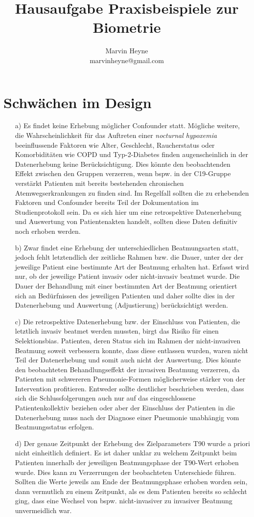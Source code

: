 \documentclass{scrartcl}
\title{Hausaufgabe Praxisbeispiele zur Biometrie}
\author{Marvin Heyne\\
  	\small marvinheyne@gmail.com \\
}
\theoremstyle{definition}
\theoremstyle{remark}
\begin{document}
\maketitle
\tableofcontents
\noindent

\section{Schwächen im Design}
\begin{enumerate}
	\item[a) ]Es findet keine Erhebung möglicher Confounder statt. Mögliche weitere, die Wahrscheinlichkeit für das Auftreten einer \textit{nocturnal hypoxemia} beeinflussende Faktoren wie Alter, Geschlecht, Raucherstatus oder Komorbiditäten wie COPD und Typ-2-Diabetes finden augenscheinlich in der Datenerhebung keine Berücksichtigung. Dies könnte den beobachtenden Effekt zwischen den Gruppen verzerren, wenn bspw. in der C19-Gruppe verstärkt Patienten mit bereits bestehenden chronischen Atemwegserkrankungen zu finden sind. Im Regelfall sollten die zu erhebenden Faktoren und Confounder bereits Teil der Dokumentation im Studienprotokoll sein. Da es sich hier um eine retrospektive Datenerhebung und Auswertung von Patientenakten handelt, sollten diese Daten definitiv noch erhoben werden. 
	\item[b) ]Zwar findet eine Erhebung der unterschiedlichen Beatmungsarten statt, jedoch fehlt letztendlich der zeitliche Rahmen bzw. die Dauer, unter der der jeweilige Patient eine bestimmte Art der Beatmung erhalten hat. Erfasst wird nur, ob der jeweilige Patient invasiv oder nicht-invasiv beatmet wurde. Die Dauer der Behandlung mit einer bestimmten Art der Beatmung orientiert sich an Bedürfnissen des jeweiligen Patienten und daher sollte dies in der Datenerhebung und Auswertung (Adjustierung) berücksichtigt werden.    
	\item[c) ]Die retrospektive Datenerhebung bzw. der Einschluss von Patienten, die letztlich invasiv beatmet werden mussten, birgt das Risiko für einen Selektionsbias. Patienten, deren Status sich im Rahmen der nicht-invasiven Beatmung soweit verbessern konnte, dass diese entlassen wurden, waren nicht Teil der Datenerhebung und somit auch nicht der Auswertung. Dies könnte den beobachteten Behandlungseffekt der invasiven Beatmung verzerren, da Patienten mit schwereren Pneumonie-Formen möglicherweise stärker von der Intervention profitieren. Entweder sollte deutlicher beschrieben werden, dass sich die Schlussfolgerungen auch nur auf das eingeschlossene Patientenkollektiv beziehen oder aber der Einschluss der Patienten in die Datenerhebung muss nach der Diagnose einer Pneumonie unabhängig vom Beatmungsstatus erfolgen. 
	\item[d) ]Der genaue Zeitpunkt der Erhebung des Zielparameters T90 wurde a priori nicht einheitlich definiert. Es ist daher unklar zu welchem Zeitpunkt beim Patienten innerhalb der jeweiligen Beatmungsphase der T90-Wert erhoben wurde. Dies kann zu Verzerrungen der beobachteten Unterschiede führen. Sollten die Werte jeweils am Ende der Beatmungsphase erhoben worden sein, dann vermutlich zu einem Zeitpunkt, als es dem Patienten bereits so schlecht ging, dass eine Wechsel von bspw. nicht-invasiver zu invasiver Beatmung unvermeidlich war. 
\end{enumerate}
\end{document}
